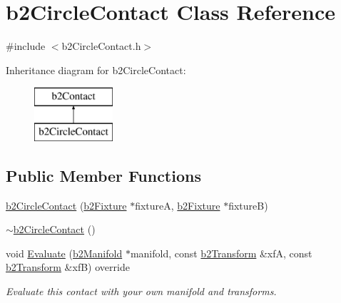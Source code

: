 \hypertarget{classb2_circle_contact}{}\section{b2\+Circle\+Contact Class Reference}
\label{classb2_circle_contact}


{\ttfamily \#include $<$b2\+Circle\+Contact.\+h$>$}

Inheritance diagram for b2\+Circle\+Contact\+:\begin{figure}[H]
\begin{center}
\leavevmode
\includegraphics[height=2.000000cm]{classb2_circle_contact}
\end{center}
\end{figure}
\subsection*{Public Member Functions}
\begin{DoxyCompactItemize}
\item 
\mbox{\hyperlink{classb2_circle_contact_a77e06c857edb2ca171340898f09ef789}{b2\+Circle\+Contact}} (\mbox{\hyperlink{classb2_fixture}{b2\+Fixture}} $\ast$fixtureA, \mbox{\hyperlink{classb2_fixture}{b2\+Fixture}} $\ast$fixtureB)
\item 
\mbox{\hyperlink{classb2_circle_contact_a231b3f142bbea245eb37ebc89f142b2a}{$\sim$b2\+Circle\+Contact}} ()
\item 
void \mbox{\hyperlink{classb2_circle_contact_a90036965fd66469e916a5afc6c244092}{Evaluate}} (\mbox{\hyperlink{structb2_manifold}{b2\+Manifold}} $\ast$manifold, const \mbox{\hyperlink{structb2_transform}{b2\+Transform}} \&xfA, const \mbox{\hyperlink{structb2_transform}{b2\+Transform}} \&xfB) override
\begin{DoxyCompactList}\small\item\em Evaluate this contact with your own manifold and transforms. \end{DoxyCompactList}\end{DoxyCompactItemize}
